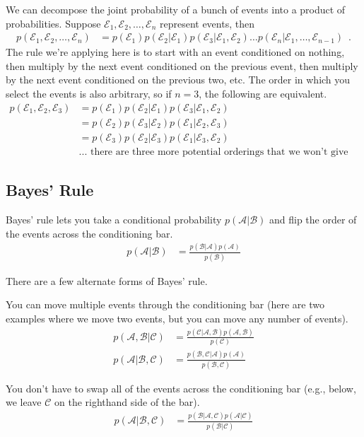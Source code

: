 \documentclass{tufte-handout}
\begin{document}
We can decompose the joint probability of a bunch of events into a product of probabilities.  Suppose $\mathcal{E}_1, \mathcal{E}_2, \ldots, \mathcal{E}_n$ represent events, then
\begin{align}
p(\mathcal{E}_1, \mathcal{E}_2, \ldots, \mathcal{E}_n) &= p(\mathcal{E}_1) p(\mathcal{E}_2 | \mathcal{E}_1) p(\mathcal{E}_3 | \mathcal{E}_1, \mathcal{E}_2) \ldots p(\mathcal{E}_n | \mathcal{E}_1, \ldots, \mathcal{E}_{n-1}) \enspace .
\end{align}
The rule we're applying here is to start with an event conditioned on nothing, then multiply by the next event conditioned on the previous event, then multiply by the next event conditioned on the previous two, etc.  The order in which you select the events is also arbitrary, so if $n=3$, the following are equivalent.
\begin{align}
p(\mathcal{E}_1, \mathcal{E}_2, \mathcal{E}_3) &= p(\mathcal{E}_1) p(\mathcal{E}_2|\mathcal{E}_1)p(\mathcal{E}_3|\mathcal{E}_1, \mathcal{E}_2) \nonumber \\
&= p(\mathcal{E}_2) p(\mathcal{E}_3|\mathcal{E}_2)p(\mathcal{E}_1|\mathcal{E}_2, \mathcal{E}_3) \nonumber \\
&= p(\mathcal{E}_3) p(\mathcal{E}_2|\mathcal{E}_3)p(\mathcal{E}_1|\mathcal{E}_3, \mathcal{E}_2) \nonumber \\
&\mbox{... there are three more potential orderings that we won't give explicitly} \nonumber
\end{align}

\subsection{Bayes' Rule}

Bayes' rule lets you take a conditional probability $p(\mathcal{A}|\mathcal{B})$ and flip the order of the events across the conditioning bar.
\begin{align}
p(\mathcal{A}|\mathcal{B}) &= \frac{p(\mathcal{B}|\mathcal{A}) p(\mathcal{A})}{p(\mathcal{B})}
\end{align}

There are a few alternate forms of Bayes' rule.
\bi
\item You can move multiple events through the conditioning bar (here are two examples where we move two events, but you can move any number of events).
\begin{align}
p(\mathcal{A}, \mathcal{B} | \mathcal{C}) &= \frac{p(\mathcal{C}|\mathcal{A}, \mathcal{B}) p(\mathcal{A}, \mathcal{B})}{p(\mathcal{C})} \\
p(\mathcal{A} |  \mathcal{B}, \mathcal{C}) &= \frac{p(\mathcal{B}, \mathcal{C}|\mathcal{A}) p(\mathcal{A})}{p(\mathcal{B}, \mathcal{C})}
\end{align}
\item You don't have to swap all of the events across the conditioning bar (e.g., below, we leave $\mathcal{C}$ on the righthand side of the bar).
\begin{align}
p(\mathcal{A}|\mathcal{B},\mathcal{C}) &= \frac{p(\mathcal{B} | \mathcal{A}, \mathcal{C}) p(\mathcal{A}|\mathcal{C})}{p(\mathcal{B}|\mathcal{C})}
\end{align}
\ei
\end{document}
